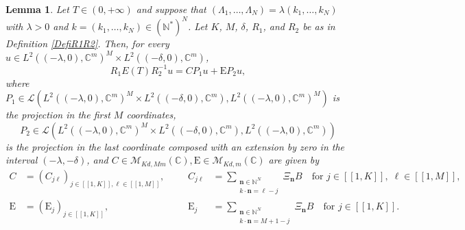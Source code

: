 \documentclass[JEP,XML,SOM,Unicode]{cedram}
\newcommand{\bn}{\boldsymbol{n}}
\newcommand{\llbracket}{[\![}
\newcommand{\rrbracket}{]\!]}
\theoremstyle{plain}
\newtheorem{lemm}[theo]{Lemma}
\theoremstyle{definition}
\newcommand{\Epsilon}{\mathrm E}
\begin{document}
\begin{lemm}
\label{LemmMatrixET}
Let $T \in (0, +\infty)$ and suppose that $(\Lambda_1, \dots, \Lambda_N) = \lambda (k_1, \dots, k_N)$ with $\lambda > 0$ and $k = (k_1, \dots, k_N) \in (\mathbb N^\ast)^N$. Let $K$, $M$, $\delta$, $R_1$, and $R_2$ be as in Definition \ref{DefiR1R2}. Then, for every $u \in L^2((-\lambda, 0), \mathbb C^m)^M \times L^2((-\delta, 0), \mathbb C^m)$,\vspace*{-3pt}
\[
R_1 E(T) R_2^{-1} u = C P_1 u + \Epsilon P_2 u,
\]
where $P_1 \in \mathcal L\left(L^2((-\lambda, 0), \mathbb C^m)^M \times L^2((-\delta, 0), \mathbb C^m), L^2((-\lambda, 0), \mathbb C^m)^M\right)$
is the projection in the first $M$ coordinates,\vspace*{-3pt}
\[
P_2 \in \mathcal L\left(L^2((-\lambda, 0), \mathbb C^m)^M \times L^2((-\delta, 0), \mathbb C^m), L^2((-\lambda, 0), \mathbb C^m)\right)
\]
is the projection in the last coordinate composed with an extension by zero in the interval $(-\lambda, -\delta)$, and $C \in \mathcal M_{K d, M m}(\mathbb C), \Epsilon \in \mathcal M_{K d, m}(\mathbb C)$ are given by
\begin{equation}
\label{DefCEps}
\begin{aligned}
C & = \left(C_{j\ell}\right)_{j \in \llbracket 1, K\rrbracket, \ell \in \llbracket 1, M\rrbracket}, & & & C_{j\ell} & = \sum_{\substack{\bn \in \mathbb N^N \\ k \cdot \bn = \ell - j}} \Xi_{\bn} B\quad \text{for } j \in \llbracket 1, K\rrbracket,\; \ell \in \llbracket 1, M\rrbracket, \\
\Epsilon & = \left(\Epsilon_j\right)_{j \in \llbracket 1, K\rrbracket}, & & & \Epsilon_j & = \sum_{\substack{\bn \in \mathbb N^N \\ k \cdot \bn = M+1 - j}} \Xi_{\bn} B \quad\text{for } j \in \llbracket 1, K\rrbracket.
\end{aligned}
\end{equation}
\end{lemm}
\end{document}
